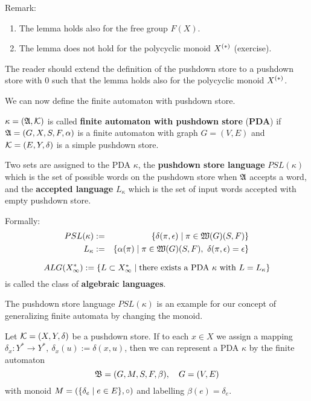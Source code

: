 Remark:
\begin{enumerate}
  \item The lemma holds also for the free group $F(X)$.
  \item The lemma does not hold for the polycyclic monoid $\mbox{${X}^{(*)}$}$
  (exercise).
\end{enumerate}

The reader should extend the definition of the pushdown store to a
pushdown store with 0 such that the lemma holds also for the polycyclic monoid
$\mbox{${X}^{(*)}$}$.

We can now define the finite automaton with pushdown store.

\begin{definition}
$\kappa = (\mbox{$\mathfrak{A}$}, \mbox{$\mathcal{K}$})$ is called {\bf finite automaton with
pushdown store} ({\bf PDA}) if $\mbox{$\mathfrak{A}$} = (G, X, S, F, \alpha)$ is a
finite automaton with graph $G = (V, E)$ and $\mbox{$\mathcal{K}$} = (E, Y,\delta)$ is a
simple pushdown store.
\end{definition}


Two sets are assigned to the PDA $\kappa$, the {\bf pushdown store language}
$PSL(\kappa)$ which is the set of possible words on the pushdown store when
$\mbox{$\mathfrak{A}$}$ accepts a word, and the {\bf accepted language} $L_\kappa$ which is the set of
 input words accepted with empty pushdown store.

Formally:
\begin{eqnarray*}
PSL(\kappa) &:=& \{ \delta(\pi, \epsilon) \mid \pi \in \pathcat{G}(S, F) \} \\
L_\kappa &:=& \{ \alpha(\pi) \mid \pi \in \pathcat{G}(S, F),\ \delta(\pi,
\epsilon) = \epsilon \}
\end{eqnarray*}

\begin{definition}
\[ ALG(X_\infty^*) := \mbox{$\{L \subset X_\infty^* \mid \text{there exists a PDA
$\kappa$ with $L = L_\kappa$}\}$}
\]
is called the class of {\bf algebraic languages}.
\end{definition}

The pushdown store language $PSL(\kappa)$ is an example for our concept of
generalizing finite automata by changing the monoid. 

Let $\mbox{$\mathcal{K}$}=(X, Y, \delta)$ be a pushdown store. If to each $x\in X$ we
assign a mapping $\delta_x: Y^* \to Y^*,\ \delta_x(u) := \delta(x, u)$, then we can 
represent a PDA $\kappa$ by the finite automaton
\[ \mbox{$\mathfrak{B}$} = (G, M, S, F, \beta),\quad G=(V,E) \]
with monoid $M = (\mbox{$\{\delta_e \mid e\in E\}$}, \circ)$ and labelling $\beta(e)
= \delta_e$.


